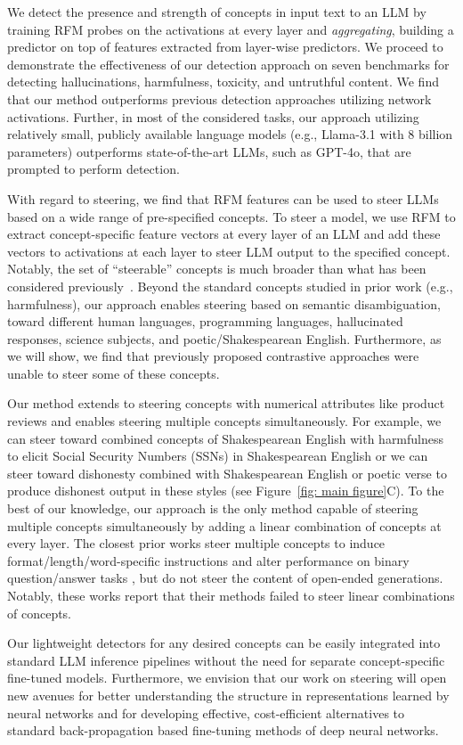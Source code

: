 We detect the presence and strength of concepts in input text to an LLM by training RFM probes on the activations at every layer and \textit{aggregating}, building a predictor on top of features extracted from layer-wise predictors.  We proceed to demonstrate the effectiveness of our detection approach on seven benchmarks for detecting hallucinations, harmfulness, toxicity, and untruthful content.  We find that our method outperforms previous detection approaches utilizing network activations. Further, in most of the considered tasks, our approach utilizing relatively small, publicly available language models (e.g., Llama-3.1 with 8 billion parameters) outperforms state-of-the-art LLMs, such as GPT-4o, that are prompted to perform detection. 

With regard to steering, we find that RFM features can be used to steer LLMs based on a wide range of pre-specified concepts. To steer a model, we use RFM to extract concept-specific feature vectors at every layer of an LLM and add these vectors to activations at each layer to steer LLM output to the specified concept. Notably, the set of ``steerable'' concepts is much broader than what has been  considered previously~\citep{othello_probe, turner2023activation, representation_engineering}. Beyond the standard concepts studied in prior work (e.g., harmfulness), our approach enables steering based on semantic disambiguation, toward different human languages, programming languages, hallucinated responses, science subjects, and poetic/Shakespearean English. Furthermore, as we will show, we find that previously proposed contrastive approaches were unable to steer some of these concepts.

Our method extends to steering concepts with numerical attributes like product reviews and enables steering multiple concepts simultaneously. For example, we can steer toward combined concepts of Shakespearean English with harmfulness to elicit Social Security Numbers (SSNs) in Shakespearean English or we can steer toward dishonesty combined with Shakespearean English or poetic verse to produce dishonest output in these styles (see Figure~\ref{fig: main figure}C). To the best of our knowledge, our approach is the only method capable of steering multiple concepts simultaneously by adding a linear combination of concepts at every layer. The closest prior works steer multiple concepts to induce format/length/word-specific instructions \citep{stolfo2024improving} and alter performance on binary question/answer tasks \citep{van2024extending}, but do not steer the content of open-ended generations. Notably, these works report that their methods failed to steer linear combinations of concepts.

Our lightweight detectors for any desired concepts can be easily integrated into standard LLM inference pipelines without the need for separate concept-specific fine-tuned models. Furthermore, we envision that our work on steering will open new avenues for better understanding the structure in representations learned by neural networks and for developing effective, cost-efficient alternatives to standard back-propagation based fine-tuning methods of deep neural networks. 
